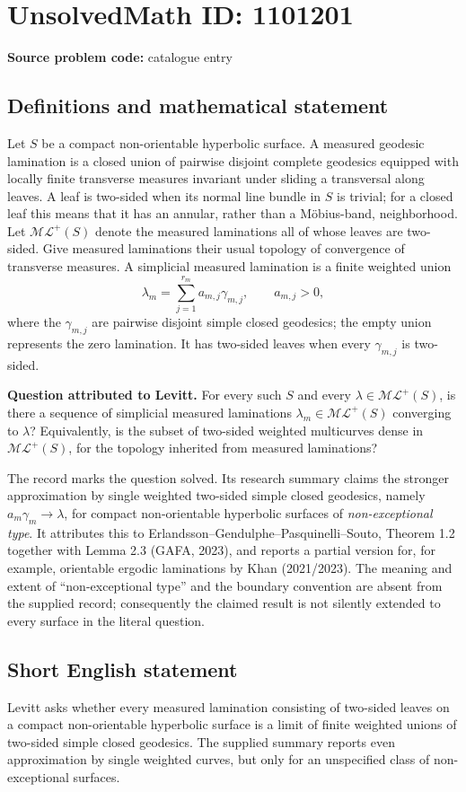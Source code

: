 \documentclass[11pt]{article}
\begin{document}
\section*{UnsolvedMath ID: 1101201}
\textbf{Source problem code:} catalogue entry
\subsection{Definitions and mathematical statement}
Let $S$ be a compact non-orientable hyperbolic surface. A measured geodesic lamination is a closed union of pairwise disjoint complete geodesics equipped with locally finite transverse measures invariant under sliding a transversal along leaves. A leaf is two-sided when its normal line bundle in $S$ is trivial; for a closed leaf this means that it has an annular, rather than a M\"obius-band, neighborhood. Let $\mathcal{ML}^{+}(S)$ denote the measured laminations all of whose leaves are two-sided. Give measured laminations their usual topology of convergence of transverse measures. A simplicial measured lamination is a finite weighted union
\[
 \lambda_m=\sum_{j=1}^{r_m}a_{m,j}\gamma_{m,j},\qquad a_{m,j}>0,
\]
where the $\gamma_{m,j}$ are pairwise disjoint simple closed geodesics; the empty union represents the zero lamination. It has two-sided leaves when every $\gamma_{m,j}$ is two-sided.

\textbf{Question attributed to Levitt.} For every such $S$ and every $\lambda\in\mathcal{ML}^{+}(S)$, is there a sequence of simplicial measured laminations $\lambda_m\in\mathcal{ML}^{+}(S)$ converging to $\lambda$? Equivalently, is the subset of two-sided weighted multicurves dense in $\mathcal{ML}^{+}(S)$, for the topology inherited from measured laminations?

The record marks the question solved. Its research summary claims the stronger approximation by single weighted two-sided simple closed geodesics, namely $a_m\gamma_m\to\lambda$, for compact non-orientable hyperbolic surfaces of \emph{non-exceptional type}. It attributes this to Erlandsson--Gendulphe--Pasquinelli--Souto, Theorem 1.2 together with Lemma 2.3 (GAFA, 2023), and reports a partial version for, for example, orientable ergodic laminations by Khan (2021/2023). The meaning and extent of ``non-exceptional type'' and the boundary convention are absent from the supplied record; consequently the claimed result is not silently extended to every surface in the literal question.
\subsection{Short English statement}
Levitt asks whether every measured lamination consisting of two-sided leaves on a compact non-orientable hyperbolic surface is a limit of finite weighted unions of two-sided simple closed geodesics. The supplied summary reports even approximation by single weighted curves, but only for an unspecified class of non-exceptional surfaces.
\end{document}
